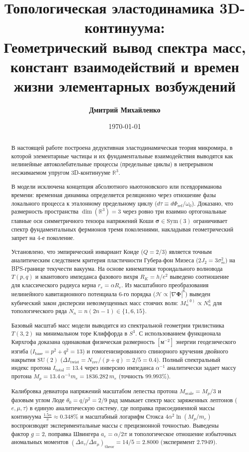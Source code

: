 \documentclass[12pt,a4paper]{article}
\title{\textbf{Топологическая эластодинамика 3D-континуума:\\ Геометрический вывод спектра масс, констант взаимодействий и времен жизни элементарных возбуждений}}
\author{\textbf{Дмитрий Михайленко}}
\date{\today}
\begin{document}
	
	\maketitle
	
	\begin{abstract}
		В настоящей работе построена дедуктивная эластодинамическая теория микромира, в которой элементарные частицы и их фундаментальные взаимодействия выводятся как нелинейные автоколебательные процессы (предельные циклы) в непрерывном несжимаемом упругом 3D-континууме $\mathbb{R}^3$. 
		
		В модели исключена концепция абсолютного ньютоновского или псевдориманова времени: временная динамика определяется реляционно через отношение фазы локального процесса к эталонному предельному циклу ($d\tau \equiv d\Phi_{\text{ref}}/\omega_0$). Доказано, что размерность пространства $\dim(\mathbb{R}^3) = 3$ через ровно три взаимно ортогональные главные оси симметричного тензора напряжений Коши $\boldsymbol{\sigma} \in \mathrm{Sym}(3)$ ограничивает спектр фундаментальных фермионов тремя поколениями, накладывая геометрический запрет на 4-е поколение.
		
		Установлено, что эмпирический инвариант Коиде ($Q = 2/3$) является точным аналитическим следствием критерия пластичности Губера-фон Мизеса ($2J_2 = 3\sigma_m^2$) на BPS-границе текучести вакуума. На основе кинематики тороидального волновода $T(p,q)$ и квантового импеданса фазового вихря $R_K = h/e^2$ выведено соотношение для классического радиуса керна $r_e = \alpha R_e$. Из масштабного преобразования нелинейного кавитационного потенциала 6-го порядка ($\mathcal{H} \propto |\nabla\boldsymbol{\Phi}|^6$) выведен кубический закон дисперсии невозмущенных масс стоячих волн: $M_n^{(0)} \propto N_n^3$ для топологического ряда $N_n = n(2n-1) \in \{1, 6, 15\}$.
		
		Базовый масштаб масс модели выводится из спектральной геометрии трилистника $T(3,2)$ на минимальном торе Клиффорда в $S^3$. С использованием функционала Кирхгофа доказана одинаковая физическая размерность $[\text{м}^{-2}]$ энергии геодезического изгиба ($I_{\text{base}} = p^2 + q^2 = 13$) и гомогенизированного спинорного кручения двойного накрытия $\mathrm{SU}(2)$ ($\Delta I_{\text{twist}} = N_{\text{rev}}/(p+q) = 2/5 = 0.4$). Полный спектральный индекс протона $I_{\text{total}} = 13.4$ через инверсию импеданса $\alpha^{-1}$ аналитически задает массу протона $M_p = 13.4 \, \alpha^{-1} m_e = 1836.282 \, m_e$ (точность $99.993\%$).
		
		Калибровка девиатора напряжений масштабом лепестка протона $M_{\text{scale}} = M_p/3$ и фазовым углом Лоде $\theta_0 = q/p^2 = 2/9$ рад замыкает спектр масс заряженных лептонов ($e, \mu, \tau$) в единую аналитическую систему, где поправка присоединенной массы континуума $\frac{1.5\alpha}{\pi} \approx 0.348\%$ и масштабный логарифм Стокса $4\alpha^2\ln(M_p/m_e)$ воспроизводят экспериментальные массы с прецизионной точностью. Выведены фактор $g=2$, поправка Швингера $a_e = \alpha/2\pi$ и топологическое отношение избыточных аномальных моментов $(\Delta a_\tau / \Delta a_\mu)_{\text{theor}} = 14/5 = 2.8000$ (эксперимент $2.7949$).
		

\end{abstract}
\end{document}
